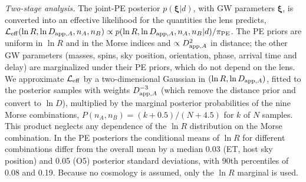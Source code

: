 \emph{Two-stage analysis.} The joint-PE posterior $p(\boldsymbol\xi|d)$, with GW parameters $\boldsymbol\xi$, is converted into an effective likelihood for the quantities the lens predicts, $\mathcal L_{\rm eff}(\ln R,\ln D_{{\rm app},A},n_A,n_B)\propto p(\ln R,\ln D_{{\rm app},A},n_A,n_B|d)/\pi_{\rm PE}$. The PE priors are uniform in $\ln R$ and in the Morse indices and $\propto D_{{\rm app},A}^2$ in distance; the other GW parameters (masses, spins, sky position, orientation, phase, arrival time and delay) are marginalized under their PE priors, which do not depend on the lens. We approximate $\mathcal L_{\rm eff}$ by a two-dimensional Gaussian in $(\ln R,\ln D_{{\rm app},A})$, fitted to the posterior samples with weights $D_{{\rm app},A}^{-3}$ (which remove the distance prior and convert to $\ln D$), multiplied by the marginal posterior probabilities of the nine Morse combinations, $P(n_A,n_B)=(k+0.5)/(N+4.5)$ for $k$ of $N$ samples. This product neglects any dependence of the $\ln R$ distribution on the Morse combination. In the PE posteriors the conditional means of $\ln R$ for different combinations differ from the overall mean by a median 0.03 (ET, host sky position) and 0.05 (O5) posterior standard deviations, with 90th percentiles of 0.08 and 0.19. Because no cosmology is assumed, only the $\ln R$ marginal is used.
